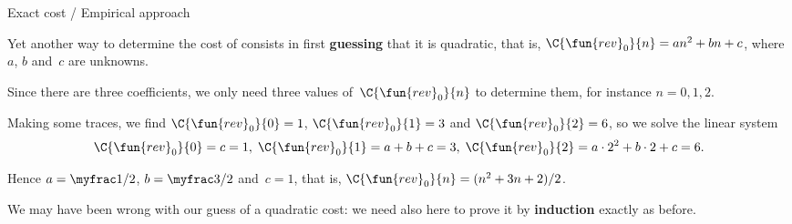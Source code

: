 %
\begin{frame}{Exact cost / Empirical approach}

  Yet another way to determine the cost of  consists in
  first \textbf{guessing} that it is quadratic, that is,
  \(\C{\fun{rev}_0}{n} = an^2 + bn + c\), where \(a\), \(b\) and~\(c\)
  are unknowns.

  \bigskip

  Since there are three coefficients, we only need three values
  of~\(\C{\fun{rev}_0}{n}\) to determine them, for instance \(n = 0,
  1, 2\).

  \bigskip

  Making some traces, we find \(\C{\fun{rev}_0}{0} = 1\),
  \(\C{\fun{rev}_0}{1} = 3\) and \(\C{\fun{rev}_0}{2} = 6\), so we
  solve the linear system
  \begin{equation*}
    \C{\fun{rev}_0}{0} = c = 1,\;
    \C{\fun{rev}_0}{1} = a + b + c = 3,\;
    \C{\fun{rev}_0}{2} = a \cdot 2^2 + b \cdot 2 + c = 6.
  \end{equation*}

  Hence \(a = \myfrac1/2\), \(b = \myfrac3/2\) and~\(c = 1\), that is,
  \(\C{\fun{rev}_0}{n} = (n^2 + 3n + 2)/2\).

  We may have been wrong with our guess of a quadratic cost: we need
  also here to prove it by \textbf{induction} exactly as before.

\end{frame}

